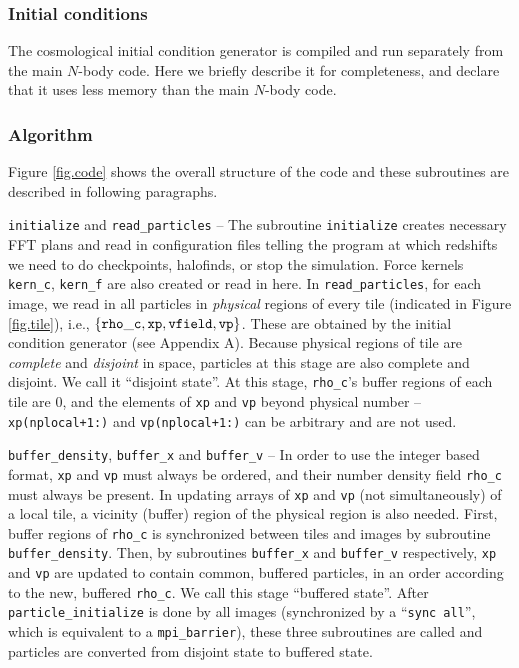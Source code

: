 \documentclass[10pt,twocolumn,preprint]{emulateapj}
\begin{document}
\subsubsection{Initial conditions}
The cosmological initial condition generator is compiled and run separately from the main $N$-body code. Here we briefly describe it for completeness, and declare that it uses less memory than the main $N$-body code.

\subsubsection{Algorithm}\label{sss.algorithm}
Figure \ref{fig.code} shows the overall structure of the code and these subroutines are described in following paragraphs. 

{\tt initialize} and {\tt read\_particles} -- The subroutine {\tt initialize} creates necessary FFT plans and read in configuration files telling the program at which redshifts we need to do checkpoints, halofinds, or stop the simulation. Force kernels {\tt kern\_c}, {\tt kern\_f} are also created or read in here. In {\tt read\_particles}, for each image, we read in all particles in {\it physical} regions of every tile (indicated in Figure \ref{fig.tile}), i.e., $\{{\tt rho\_c},{\tt xp},{\tt vfield},{\tt vp}\}$. These are obtained by the initial condition generator (see Appendix A). Because physical regions of tile are {\it complete} and {\it disjoint} in space, particles at this stage are also complete and disjoint. We call it ``disjoint state''. At this stage, {\tt rho\_c}'s buffer regions of each tile are 0, and the elements of {\tt xp} and {\tt vp} beyond physical number -- {\tt xp(nplocal+1:)} and {\tt vp(nplocal+1:)} can be arbitrary and are not used.

{\tt buffer\_density}, {\tt buffer\_x} and {\tt buffer\_v} -- In order to use the integer based format, {\tt xp} and {\tt vp} must always be ordered, and their number density field {\tt rho\_c} must always be present. In updating arrays of {\tt xp} and {\tt vp} (not simultaneously) of a local tile, a vicinity (buffer) region of the physical region is also needed. First, buffer regions of {\tt rho\_c} is synchronized between tiles and images by subroutine {\tt buffer\_density}. Then, by subroutines {\tt buffer\_x} and {\tt buffer\_v} respectively, {\tt xp} and {\tt vp} are updated to contain common, buffered particles, in an order according to the new, buffered {\tt rho\_c}. We call this stage ``buffered state''. After {\tt particle\_initialize} is done by all images (synchronized by a ``{\tt sync all}'', which is equivalent to a {\tt mpi\_barrier}), these three subroutines are called and particles are converted from disjoint state to buffered state.
\end{document}
